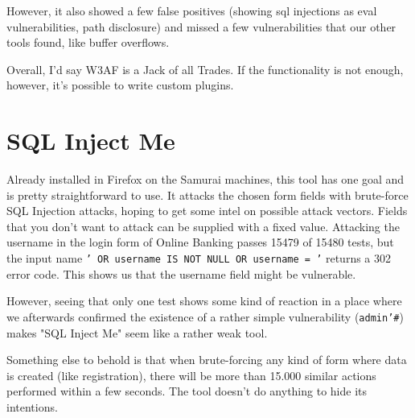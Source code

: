 However, it also showed a few false positives (showing sql injections as eval vulnerabilities, path disclosure) and missed a few vulnerabilities that our other tools found, like buffer overflows.

Overall, I'd say W3AF is a Jack of all Trades. If the functionality is not enough, however, it's possible to write custom plugins.

\section{SQL Inject Me}

Already installed in Firefox on the Samurai machines, this tool has one goal and is pretty straightforward to use. It attacks the chosen form fields with brute-force SQL Injection attacks, hoping to get some intel on possible attack vectors. Fields that you don't want to attack can be supplied with a fixed value.
Attacking the username in the login form of Online Banking passes 15479 of 15480 tests, but the input name \texttt{' OR username IS NOT NULL OR username = '} returns a 302 error code. This shows us that the username field might be vulnerable.

However, seeing that only one test shows some kind of reaction in a place where we afterwards confirmed the existence of a rather simple vulnerability (\texttt{admin'\#}) makes "SQL Inject Me" seem like a rather weak tool.

Something else to behold is that when brute-forcing any kind of form where data is created (like registration), there will be more than 15.000 similar actions performed within a few seconds. The tool doesn't do anything to hide its intentions.

